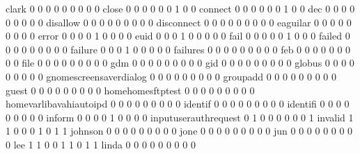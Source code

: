 \documentclass[compress,8pt]{beamer}
\begin{document}
\begin{frame}
\begin{Schunk}
  clark                                      0   0   0   0   0   0   0   0   0
  close                                      0   0   0   0   0   0   1   0   0
  connect                                    0   0   0   0   0   0   1   0   0
  dec                                        0   0   0   0   0   0   0   0   0
  disallow                                   0   0   0   0   0   0   0   0   0
  disconnect                                 0   0   0   0   0   0   0   0   0
  eaguilar                                   0   0   0   0   0   0   0   0   0
  error                                      0   0   0   0   1   0   0   0   0
  euid                                       0   0   0   1   0   0   0   0   0
  fail                                       0   0   0   0   0   1   0   0   0
  failed                                     0   0   0   0   0   0   0   0   0
  failure                                    0   0   0   1   0   0   0   0   0
  failures                                   0   0   0   0   0   0   0   0   0
  feb                                        0   0   0   0   0   0   0   0   0
  file                                       0   0   0   0   0   0   0   0   0
  gdm                                        0   0   0   0   0   0   0   0   0
  gid                                        0   0   0   0   0   0   0   0   0
  globus                                     0   0   0   0   0   0   0   0   0
  gnomescreensaverdialog                     0   0   0   0   0   0   0   0   0
  groupadd                                   0   0   0   0   0   0   0   0   0
  guest                                      0   0   0   0   0   0   0   0   0
  homehomesftptest                           0   0   0   0   0   0   0   0   0
  homevarlibavahiautoipd                     0   0   0   0   0   0   0   0   0
  identif                                    0   0   0   0   0   0   0   0   0
  identifi                                   0   0   0   0   0   0   0   0   0
  inform                                     0   0   0   0   1   0   0   0   0
  inputuserauthrequest                       0   1   0   0   0   0   0   0   1
  invalid                                    1   1   0   0   0   1   0   1   1
  johnson                                    0   0   0   0   0   0   0   0   0
  jone                                       0   0   0   0   0   0   0   0   0
  jun                                        0   0   0   0   0   0   0   0   0
  lee                                        1   1   0   0   1   1   0   1   1
  linda                                      0   0   0   0   0   0   0   0   0

\end{Schunk}
\end{frame}
\end{document}
